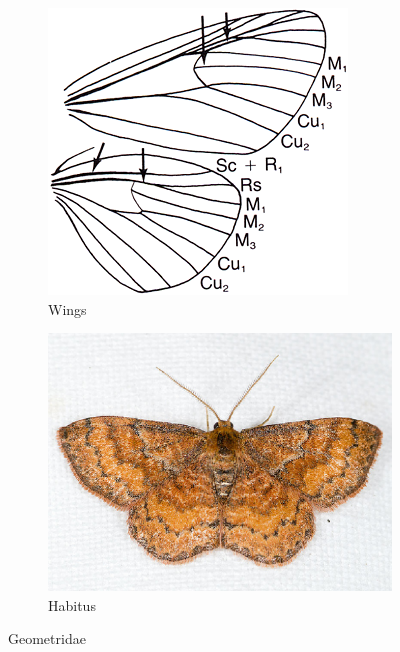 \documentclass[letterpaper, 11pt]{article}
\begin{document}
\begin{figure}[ht!]
    \centering
    \begin{subfigure}[ht!]{0.35\textwidth}
        \includegraphics[width=\textwidth]{image17}
        \caption{Wings}
        \label{fig:geometrid1}
    \end{subfigure}
    \qquad %
    \begin{subfigure}[ht!]{0.48\textwidth}
        \includegraphics[width=\textwidth]{image22}
        \caption{Habitus}
        \label{fig:geometrid2}
    \end{subfigure}
    \caption{Geometridae}\label{fig:geometrids}
\end{figure}
\end{document}

